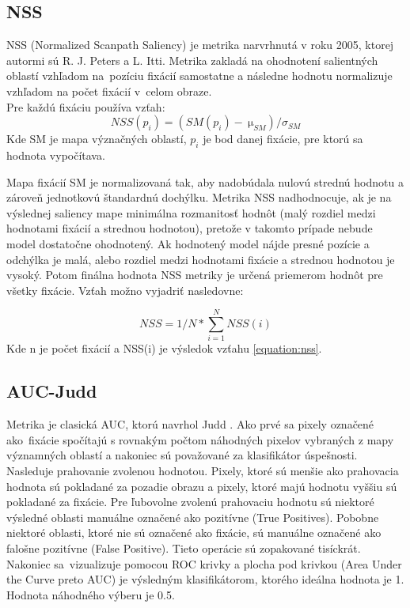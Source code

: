 \subsection{NSS}
NSS (Normalized Scanpath Saliency) je metrika narvrhnutá v roku 2005, ktorej autormi sú R. J. Peters a L. Itti.
Metrika zakladá na ohodnotení salientných oblastí vzhľadom na~pozíciu fixácií samostatne a následne hodnotu normalizuje vzhľadom na počet fixácií v~celom obraze\cite{metrics-1}.
\\
Pre každú fixáciu používa vzťah:
  \begin{equation}
    NSS(p_i) =  (SM(p_i)-\SI{}{\micro}_{SM}) / 	\sigma_{SM}
    \label{equation:nss}
  \end{equation}
Kde SM je mapa význačných oblastí, \begin{math}p_i\end{math} je bod danej fixácie, pre ktorú sa hodnota vypočítava.

Mapa fixácií SM je normalizovaná tak, aby nadobúdala nulovú strednú hodnotu a zároveň jednotkovú štandardnú dochýlku.
Metrika NSS nadhodnocuje, ak je na výslednej saliency mape minimálna rozmanitosť hodnôt (malý rozdiel medzi hodnotami fixácií a strednou hodnotou), pretože v takomto prípade nebude model dostatočne ohodnotený.
Ak hodnotený model nájde presné pozície a odchýlka je malá, alebo rozdiel medzi hodnotami fixácie a strednou hodnotou je vysoký.
Potom finálna hodnota NSS metriky je určená priemerom hodnôt pre všetky fixácie\cite{metrics-1}.
Vzťah možno vyjadriť nasledovne:

\begin{equation}
  NSS = 1/N * \sum_{i=1}^{N}NSS(i)  
\end{equation}
Kde n je počet fixácií a NSS(i) je výsledok vzťahu \ref{equation:nss}.

\subsection{AUC-Judd}
Metrika je clasická AUC, ktorú navrhol Judd \cite{auc-judd}.
Ako prvé sa pixely označené ako~fixácie spočítajú s rovnakým počtom náhodných pixelov vybraných z mapy významných oblastí a nakoniec sú považované za klasifikátor úspešnosti.
Nasleduje prahovanie zvolenou hodnotou.
Pixely, ktoré sú menšie ako prahovacia hodnota sú pokladané za pozadie obrazu a pixely, ktoré majú hodnotu vyššiu sú pokladané za fixácie.
Pre ľubovolne zvolenú prahovaciu hodnotu sú niektoré výsledné oblasti manuálne označené ako pozitívne (True Positives).
Pobobne niektoré oblasti, ktoré nie sú označené ako fixácie, sú manuálne označené ako falošne pozitívne (False Positive).
Tieto operácie sú zopakované tisíckrát.
Nakoniec sa~vizualizuje pomocou ROC krivky a plocha pod krivkou (Area Under the Curve preto AUC) je výsledným klasifikátorom, ktorého ideálna hodnota je 1.
Hodnota náhodného výberu je 0.5.

